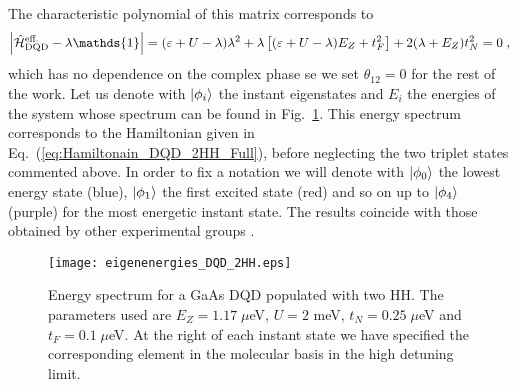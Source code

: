 The characteristic polynomial of this matrix corresponds to
\begin{equation}
	\abs{\hat{\mathcal{H}}_{\text{DQD}}^{\text{eff.}}-\lambda\mathds{1}}=(\varepsilon+U-\lambda)\lambda^2+\lambda\left[(\varepsilon+U-\lambda)E_Z+t_F^2\right]+2(\lambda+E_Z)t_N^2=0\; ,
\end{equation}
which has no dependence on the complex phase se we set $\theta_{12}=0$ for the rest of the work. Let us denote with $\ket{\phi_i}$ the instant eigenstates and $E_i$ the energies of the system whose spectrum can be found in Fig.~\ref{fig:eigenenergies_DQD_2HH}. This energy spectrum corresponds to the Hamiltonian given in Eq.~(\ref{eq:Hamiltonain_DQD_2HH_Full}), before neglecting the two triplet states commented above. In order to fix a notation we will denote with $\ket{\phi_0}$ the lowest energy state (blue), $\ket{\phi_1}$ the first excited state (red) and so on up to $\ket{\phi_4}$ (purple) for the most energetic instant state. The results coincide with those obtained by other experimental groups \cite{SachrajdaUnpublished}.
\begin{figure}[!htbp]
	\centering
	\texttt{[image: eigenenergies\_DQD\_2HH.eps]}
	\caption{Energy spectrum for a GaAs DQD populated with two HH. The parameters used are $E_Z=1.17\; \mu$eV, $U=2$ meV, $t_N=0.25\; \mu$eV and $t_F=0.1\; \mu$eV. At the right of each instant state we have specified the corresponding element in the molecular basis in the high detuning limit.}
	\label{fig:eigenenergies_DQD_2HH}
\end{figure}

